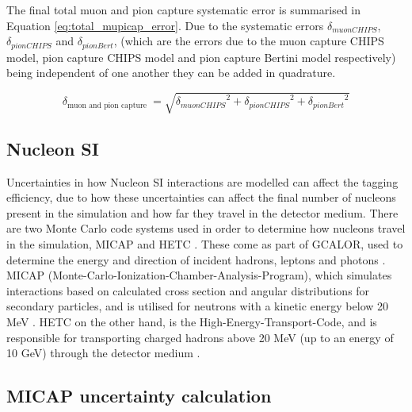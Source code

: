 The final total muon and pion capture systematic error is summarised in Equation \ref{eq:total_mupicap_error}. Due to the systematic errors $\delta_{muon C H I P S}$, $\delta_{pion C H I P S}$ and $\delta_{pion B e r t}$, (which are the errors due to the muon capture CHIPS model, pion capture CHIPS model and pion capture Bertini model respectively) being independent of one another they can be added in quadrature.

\begin{equation}
    \delta_{\text {muon and pion capture }}=\sqrt{{\delta_{muon C H I P S}}^2 + {\delta_{pion C H I P S}}^2 + {\delta_{pion B e r t}}^2 }
\label{eq:total_mupicap_error}
\end{equation}


\subsection{Nucleon SI}
Uncertainties in how Nucleon SI interactions are modelled can affect the tagging efficiency, due to how these uncertainties can affect the final number of nucleons present in the simulation and how far they travel in the detector medium. There are two Monte Carlo code systems used in order to determine how nucleons travel in the simulation, MICAP and HETC \cite{micap_hetc}. These come as part of GCALOR, used to determine the energy and direction of incident hadrons, leptons and photons \cite{1998gcalor}. MICAP (Monte-Carlo-Ionization-Chamber-Analysis-Program), which simulates interactions based on calculated cross section and angular distributions for secondary particles, and is utilised for neutrons with a kinetic energy below 20 MeV \cite{Zeitnitz:1994bs}. HETC on the other hand, is the High-Energy-Transport-Code, and is responsible for transporting charged hadrons above 20 MeV (up to an energy of 10 GeV) through the detector medium \cite{gabrielhetc}. 

\subsection{MICAP uncertainty calculation}

